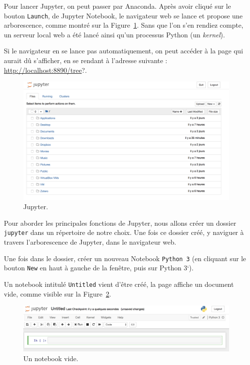 \documentclass[12pt,]{book}
\numberwithin{equation}{section}
\numberwithin{countremarque}{section}
\begin{document}
Pour lancer Jupyter, on peut passer par Anaconda. Après avoir cliqué sur
le bouton \texttt{Launch}, de Jupyter Notebook, le navigateur web se
lance et propose une arborescence, comme montré sur la
Figure~\ref{fig:intro-jupyter}. Sans que l'on s'en rendiez compte, un
serveur local web a été lancé ainsi qu'un processus Python (un
\emph{kernel}).

Si le navigateur en se lance pas automatiquement, on peut accéder à la
page qui aurait dû s'afficher, en se rendant à l'adresse suivante :
\url{http://localhost:8890/tree}?.

\begin{figure}[H]

{\centering \includegraphics[width=1\linewidth]{figs/jupyter} 

}

\caption{Jupyter.}\label{fig:intro-jupyter}
\end{figure}

Pour aborder les principales fonctions de Jupyter, nous allons créer un
dossier \texttt{jupyter} dans un répertoire de notre choix. Une fois ce
dossier créé, y naviguer à travers l'arborescence de Jupyter, dans le
navigateur web.

Une fois dans le dossier, créer un nouveau Notebook \texttt{Python\ 3}
(en cliquant sur le bouton \texttt{New} en haut à gauche de la fenêtre,
puis sur Python 3`).

Un notebook intitulé \texttt{Untitled} vient d'être créé, la page
affiche un document vide, comme visible sur la
Figure~\ref{fig:intro-jupyter-notebook}.

\begin{figure}[H]

{\centering \includegraphics[width=1\linewidth]{figs/jupyter_notebook} 

}

\caption{Un notebook vide.}\label{fig:intro-jupyter-notebook}
\end{figure}
\end{document}
